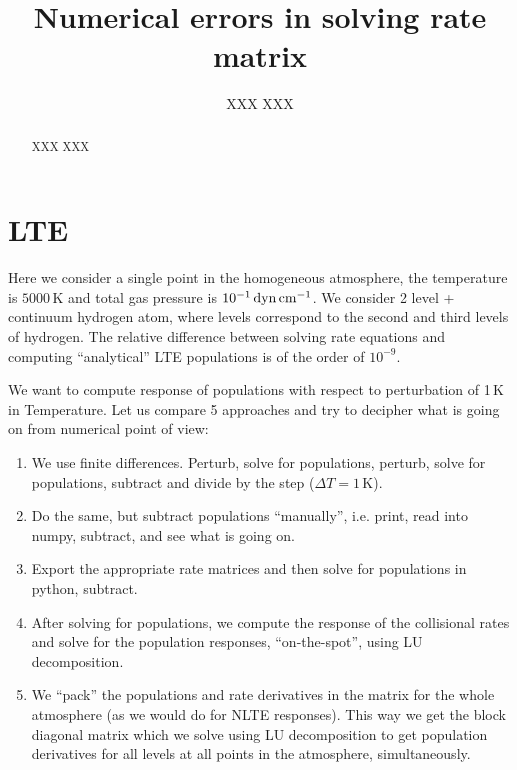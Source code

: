 \documentclass[a4paper,10pt]{article}
\title{Numerical errors in solving rate matrix}
\author{XXX XXX}
\begin{document}
\maketitle

\begin{abstract}
XXX XXX
\end{abstract}

\section{LTE}
Here we consider a single point in the homogeneous atmosphere, the temperature is $5000$\,K and total gas pressure is $10^{-1}\,\rm{dyn\,cm^{-1}}$. We consider 2 level + continuum hydrogen atom, where levels correspond to the second and third levels of hydrogen. The relative difference between solving rate equations and computing ``analytical'' LTE populations is of the order of $10^{-9}$.

We want to compute response of populations with respect to perturbation of 1\,K in Temperature. Let us compare 5 approaches and try to decipher what is going on from numerical point of view:
\begin{enumerate}
 \item We use finite differences. Perturb, solve for populations, perturb, solve for populations, subtract and divide by the step ($\Delta T = 1$\,K).
 \item Do the same, but subtract populations ``manually'', i.e. print, read into numpy, subtract, and see what is going on.
 \item Export the appropriate rate matrices and then solve for populations in python, subtract.
 \item After solving for populations, we compute the response of the collisional rates and solve for the population responses, ``on-the-spot'', using LU decomposition.
 \item We ``pack'' the populations and rate derivatives in the matrix for the whole atmosphere (as we would do for NLTE responses). This way we get the block diagonal matrix which we solve using LU decomposition to get population derivatives for all levels at all points in the atmosphere, simultaneously. 
\end{enumerate}
\end{document}
